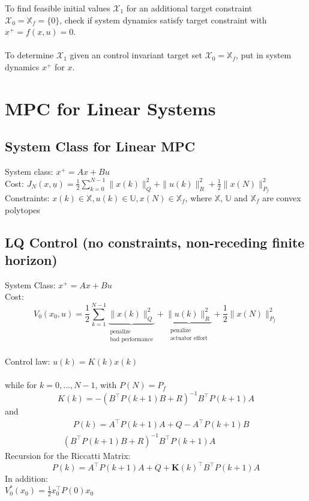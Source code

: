 \documentclass[english]{latex4ei/latex4ei_sheet}
\begin{document}
\begin{sectionbox}
To find feasible initial values $\mathcal{X}_1$ for an additional target constraint $\mathcal{X}_0=\mathbb{X}_f=\{0\}$, check if system dynamics satisfy target constraint with $x^{+}=f(x,u)=0$.\\
\\
To determine $\mathcal{X}_1$ given an control invariant target set $\mathcal{X}_0=\mathbb{X}_f$, put in system dynamics $x^{+}$ for $x$.

\end{sectionbox}

\newpage
\section{MPC for Linear Systems}
\begin{sectionbox}

\subsection{System Class for Linear MPC}
System class: $x^{+}=A x+B u$ \\
Cost: $J_{N}(x, \underline{u})=\frac{1}{2} \sum\limits_{k=0}^{N-1}\|x(k)\|_{Q}^{2}+\|u(k)\|_{R}^{2}+\frac{1}{2}\|x(N)\|_{P_{f}}^{2}$ \\
Constraints: $x(k) \in \mathbb{X}, u(k) \in \mathbb{U}, x(N) \in \mathbb{X}_{f}$, where $\mathbb{X}$, $\mathbb{U}$ and $\mathbb{X}_{f}$ are convex polytopes\\

\subsection{LQ Control (no constraints, non-receding finite horizon)}
System Class: $x^{+}=A x+B u$ \\
Cost: $$V_{0}\left(x_{0}, u\right)=\frac{1}{2} \sum_{k=1}^{N-1}\underbrace{\|x(k)\|_{Q}^{2}}_{\substack{\text{penalize} \\ \text{bad performance}}}+\underbrace{\|u(k)\|_{R}^{2}}_{\substack{\text{penalize} \\ \text{actuator effort}}}+\frac{1}{2}\|x(N)\|_{P_{f}}^{2}$$ \\
Control law: $u(k)=K(k) x(k)$ \\
\\
while for $k=0, \ldots, N-1$, with $P(N)=P_{f}$
$$K(k)=-\left(B^{\top} P(k+1) B+R\right)^{-1} B^{\top} P(k+1) A$$ and
\begin{multline*}
    \quad\ P(k)=A^{\top} P(k+1) A+Q-A^{\top} P(k+1) B\\\left(B^{\top} P(k+1) B+R\right)^{-1} B^{\top} P(k+1) A
\end{multline*}
Recursion for the Riccatti Matrix:
$$P(k)=A^{\top} P(k+1) A+Q+\boldsymbol{K}(k)^{\top}B^{\top} P(k+1)A$$
In addition:\\ 
$V_{0}^{*}\left(x_{0}\right)=\frac{1}{2} x_{0}^{\top} P(0) x_{0}$\\


\end{sectionbox}
\end{document}
